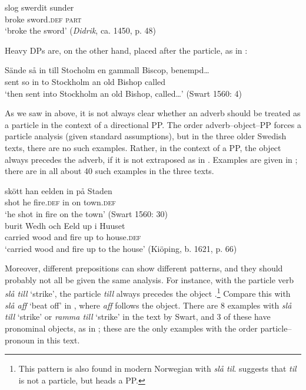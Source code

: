\documentclass[output=paper]{langscibook}
\begin{document}
\ex
\gll  slog     swerdit     sunder \\
    broke   sword\textsc{.def}   \textsc{part}\\
\glt `broke the sword’ (\textit{Didrik}, ca. 1450, p. 48)\\
\z
\z


Heavy DPs are, on the other hand, placed after the particle, as in :


\ea\label{ex:lalu:24}
\gll  Sände   så  in   till   Stocholm     en   gammall   Biscop,   benempd…\\
sent       so    in   to     Stockholm     an   old       Bishop   called\\
\glt `then sent into Stockholm an old Bishop, called…’ (Swart 1560: 4)\\
\z


As we saw in  above, it is not always clear whether an adverb should be treated as a particle in the context of a directional PP. The order adverb–object–PP forces a particle analysis (given standard assumptions), but in the three older Swedish texts, there are no such examples. Rather, in the context of a PP, the object always precedes the adverb, if it is not extraposed as in . Examples are given in ; there are in all about 40 such examples in the three texts.


\ea\label{ex:lalu:25}
\ea\label{ex:lalu:25a}
\gll  skött  han   eelden     in     på   Staden\\
    shot     he   fire\textsc{.def}     in   on   town\textsc{.def} \\
\glt `he shot in fire on the town’ (Swart 1560: 30)\\

\ex\label{ex:lalu:25b}
\gll  burit     Wedh   och   Eeld   up   i   Huuset \\
    carried   wood   and   fire   up   to   house\textsc{.def}\\
\glt `carried wood and fire up to the house’ (Kiöping, b. 1621, p. 66)\\
\z
\z


Moreover, different prepositions can show different patterns, and they should probably not all be given the same analysis. For instance, with the particle verb \textit{slå till} ‘strike’, the particle \textit{till} always precedes the object .\footnote{This pattern is also found in modern Norwegian with \textit{slå til}. \citet{Tungseth2006} suggests that \textit{til} is not a particle, but heads a PP.} Compare this with \textit{slå aff} ‘beat off’ in , where \textit{aff} follows the object. There are 8 examples with \textit{slå till} ‘strike’ or \textit{ramma till} ‘strike’ in the text by Swart, and 3 of these have pronominal objects, as in ; these are the only examples with the order particle–pronoun in this text.
\end{document}
